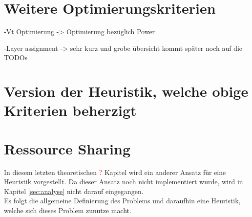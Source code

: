 \documentclass[11pt, a4paper, german]{article}
\begin{document}
\section{Weitere Optimierungskriterien}
	-Vt Optimierung -> Optimierung bezüglich Power
	
	-Layer assignment -> sehr kurz und grobe übersicht kommt später noch auf die TODOs 
	
	
\section{Version der Heuristik, welche obige Kriterien beherzigt}
\section{Ressource Sharing}
In diesem letzten theoretischen \textcolor{red}{?} Kapitel wird ein anderer Ansatz für eine Heuristik vorgestellt. Da dieser Ansatz noch nicht implementiert wurde, wird in Kapitel \ref{sec:analyse} nicht darauf eingegangen.\\
Es folgt die allgemeine Definierung des Problems und daraufhin eine Heuristik, welche sich dieses Problem zunutze macht.\\
\end{document}
